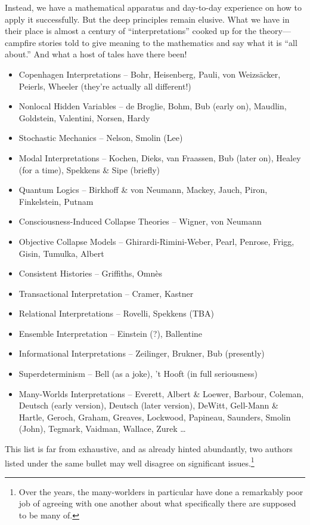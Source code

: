\documentclass[aps,pra,superscriptaddress,12pt,tightenlines,nofootinbib]{revtex4-2}
\begin{document}
Instead, we have a mathematical apparatus and day-to-day experience on how to apply it successfully.  But the deep principles remain elusive.  What we have in their place is almost a century of ``interpretations'' cooked up for the theory---campfire stories told to give meaning to the mathematics and say what it is ``all about.''  And what a host of tales have there been!
\begin{flushleft}
\begin{itemize}
\item Copenhagen Interpretations -- Bohr, Heisenberg, Pauli, von Weizs\"acker, Peierls, Wheeler (they're actually all different!)
\item Nonlocal Hidden Variables -- de Broglie, Bohm, Bub (early on), Maudlin, Goldstein, Valentini, Norsen, Hardy
\item Stochastic Mechanics -- Nelson, Smolin (Lee)
\item Modal Interpretations -- Kochen, Dieks, van Fraassen, Bub (later on), Healey (for a time),
  Spekkens \& Sipe (briefly)
\item Quantum Logics -- Birkhoff \& von Neumann, Mackey, Jauch, Piron, Finkelstein, Putnam
\item Consciousness-Induced Collapse Theories -- Wigner, von Neumann
\item Objective Collapse Models -- Ghirardi-Rimini-Weber, Pearl, Penrose, Frigg, Gisin, Tumulka, Albert
\item Consistent Histories -- Griffiths, Omn\`es
\item Transactional Interpretation -- Cramer, Kastner
\item Relational Interpretations -- Rovelli, Spekkens (TBA)
\item Ensemble Interpretation -- Einstein (?), Ballentine
\item Informational Interpretations -- Zeilinger, Brukner, Bub (presently)
\item Superdeterminism -- Bell (as a joke), 't Hooft (in full seriousness)
\item Many-Worlds Interpretations -- Everett, Albert \& Loewer, Barbour,
  Coleman, Deutsch (early version), Deutsch (later version), DeWitt, Gell-Mann \& Hartle, Geroch,
  Graham, Greaves, Lockwood, Papineau, Saunders,
  Smolin (John), Tegmark, Vaidman, Wallace, Zurek \ldots
\end{itemize}
\end{flushleft}
This list is far from exhaustive, and as already hinted abundantly, two authors listed under the same bullet may well disagree on significant issues.\footnote{Over the years, the many-worlders in particular have done a remarkably poor job of agreeing with one another about what specifically there are supposed to be many of.}
\end{document}
